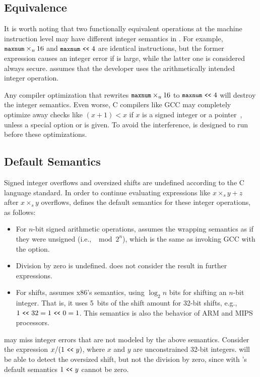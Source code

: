 \subsection{Equivalence}
\label{s:sema:eqv}

It is worth noting that two functionally equivalent operations at
the machine instruction level may have different integer semantics
in \sys.
For example, $\cc{maxnum}\times_u 16$ and $\cc{maxnum} \shl 4$ are
identical instructions, but the former expression causes an integer
error if  is large, while the latter one is considered
always secure.  \sys assumes that the developer uses the
arithmetically intended integer operation. 

Any compiler optimization that rewrites
$\cc{maxnum}\times_u 16$ to $\cc{maxnum} \shl 4$ will destroy the
integer semantics.  Even worse, C compilers like GCC may completely
optimize away checks like $(x + 1) < x$ if $x$ is a signed integer
or a pointer~\cite{gcc:signed-overflow,us-cert:gcc}, unless a special
option  or  is
given.  To avoid the interference, \sys is designed to run before
these optimizations.

\subsection{Default Semantics}
\label{s:sema:def}

Signed integer overflows and oversized shifts are undefined according
to the C language standard.  In order to continue evaluating
expressions like $x \times_s y + z$ after $x \times_s y$ overflows,
\sys defines the default semantics for these integer operations, as
follows:
\begin{itemize}
\item
For $n$-bit signed arithmetic operations, \sys assumes the wrapping
semantics as if they were unsigned (i.e., $\mod{2^n}$), which is
the same as invoking GCC with the  option.
\item
Division by zero is undefined.  \sys does not consider the result
in further expressions.
\item
For shifts, \sys assumes x86's semantics, using $\log_2 n$ bits for
shifting an $n$-bit integer.  That is, it uses 5~bits of the shift
amount for 32-bit shifts, e.g., $1 \shl 32 = 1 \shl 0 = 1$.  This semantics
is also the behavior of ARM and MIPS processors.
\end{itemize}
\sys may miss integer errors that are not modeled by the above
semantics.  Consider the expression $x / (1 \shl y)$, where $x$ and
$y$ are unconstrained 32-bit integers.  \sys will be able to detect
the oversized shift, but not the division by zero, since
with \sys's default semantics $1 \shl y$ cannot be zero.

